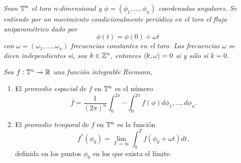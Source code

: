 \begin{defn}
  \em
  Sean $\mathbb{T}^n$ el toro n-dimensional y $\phi=(\phi_1,\dots,\phi_n)$ coordenadas angulares. Se entiende por un \emph{movimiento condicionalmente periódico} en el toro el flujo uniparamétrico dado por 
  \begin{equation*}
    \phi(t)=\phi(0)+\omega t
  \end{equation*}
  con $\omega=(\omega_1,\dots,\omega_n)$ \emph{frecuencias} constantes en el toro. Las frecuencias $\omega$ se dicen \emph{independientes} si, sea $k \in \mathbb{Z}^n$, entonces $\left\langle k,\omega\right\rangle=0$ si y sólo si $k=0$.
\end{defn}
\begin{defn}
  \em
  Sea $f:\mathbb{T}^n \rightarrow \mathbb{R}$ una función integrable Riemann,
  \begin{enumerate}
    \item El \emph{promedio espacial} de $f$ en $\mathbb{T}^n$ es el número
      \begin{equation*}
	\bar{f}=\frac{1}{(2\pi)^n}\int_0^{2\pi} \cdots \int_0^{2\pi} f(\phi) d\phi_1,\dots,d\phi_n.
      \end{equation*}
    \item El \emph{promedio temporal} de $f$ en $\mathbb{T}^n$ es la función
      \begin{equation*}
	f^*(\phi_0)=\lim_{T\rightarrow \infty} \int_0^{T}f(\phi_0+\omega t) dt,
      \end{equation*}
      definida en los puntos $\phi_0$ en los que exista el límite.
  \end{enumerate}
\end{defn}

